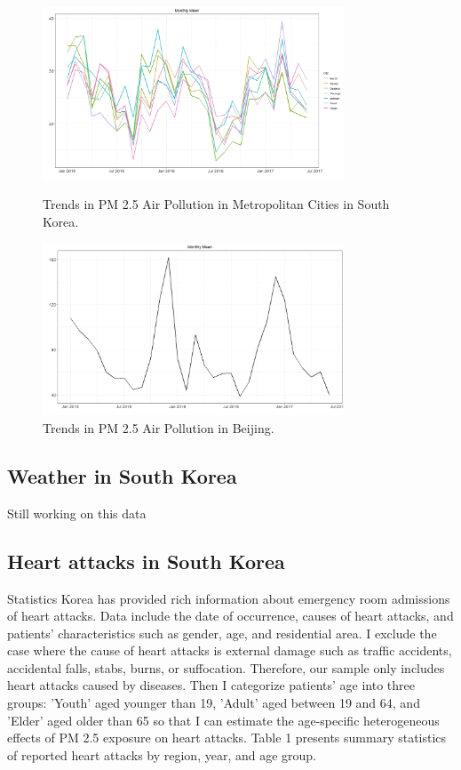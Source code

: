 \documentclass{article}
\begin{document}
\begin{figure}[h]
    \centering
    \includegraphics[width=0.8\textwidth]{figures/pm25_Korea.jpeg}
    \caption{Trends in PM 2.5 Air Pollution in Metropolitan Cities in South Korea.}
    \label{fig:1}
    \bigskip
    \bigskip
    \centering
    \includegraphics[width=0.8\textwidth]{figures/pm25_Beijing.jpeg}
    \caption{Trends in PM 2.5 Air Pollution in Beijing.}
    \label{fig:2}
\end{figure}


\subsection{Weather in South Korea}
Still working on this data

\subsection{Heart attacks in South Korea}
Statistics Korea has provided rich information about emergency room admissions of heart attacks. Data include the date of occurrence, causes of heart attacks, and patients' characteristics such as gender, age, and residential area. I exclude the case where the cause of heart attacks is external damage such as traffic accidents, accidental falls, stabs, burns, or suffocation. Therefore, our sample only includes heart attacks caused by diseases. Then I categorize patients' age into three groups: 'Youth' aged younger than 19, 'Adult' aged between 19 and 64, and 'Elder' aged older than 65 so that I can estimate the age-specific heterogeneous effects of PM 2.5 exposure on heart attacks. Table 1 presents summary statistics of reported heart attacks by region, year, and age group.
\end{document}
